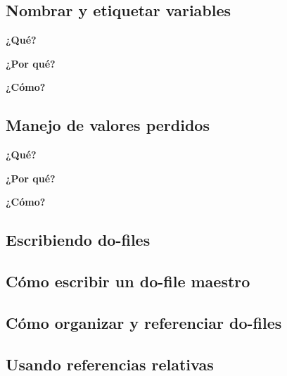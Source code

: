 \documentclass[11pt,en]{elegantpaper}
\begin{document}
\subsection{Nombrar y etiquetar variables}
\textbf{¿Qué?}


\textbf{¿Por qué?} 


\textbf{¿Cómo?} 
\subsection{Manejo de valores perdidos}
\textbf{¿Qué?}


\textbf{¿Por qué?}


\textbf{¿Cómo?}
\subsection{Escribiendo do-files}

\subsection{Cómo escribir un do-file maestro}

\subsection{Cómo organizar y referenciar do-files}

\subsection{Usando referencias relativas}
\end{document}
